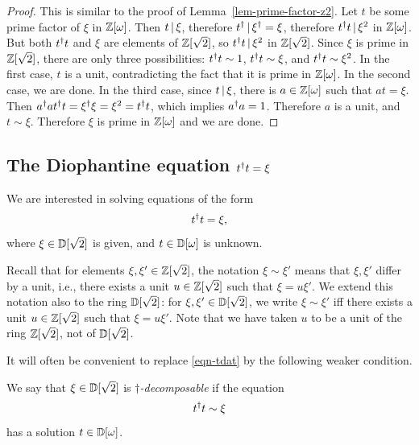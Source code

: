 \begin{proof}
  This is similar to the proof of Lemma~\ref{lem-prime-factor-z2}.
  Let $t$ be some prime factor of $\xi$ in $\mathbb{Z}[\omega]$. Then
  $t\mathop{|}\nolimits \xi$, therefore $t^{\dagger}\mathop{|}\nolimits \xi^{\dagger}=\xi$, therefore
  $t^{\dagger} t\mathop{|}\nolimits \xi^2$ in $\mathbb{Z}[\omega]$. But both $t^{\dagger} t$ and $\xi$
  are elements of $\mathbb{Z}[\sqrt2]$, so $t^{\dagger} t\mathop{|}\nolimits \xi^2$ in
  $\mathbb{Z}[\sqrt2]$. Since $\xi$ is prime in $\mathbb{Z}[\sqrt2]$, there are only
  three possibilities: $t^{\dagger} t\sim 1$, $t^{\dagger} t\sim \xi$, and $t^{\dagger}
  t\sim \xi^2$. In the first case, $t$ is a unit, contradicting the
  fact that it is prime in $\mathbb{Z}[\omega]$. In the second case, we are
  done. In the third case, since $t\mathop{|}\nolimits \xi$, there is
  $a\in\mathbb{Z}[\omega]$ such that $at=\xi$. Then $a^{\dagger} at^{\dagger}
  t=\xi^{\dagger}\xi=\xi^2 = t^{\dagger} t$, which implies $a^{\dagger} a=1$. Therefore $a$
  is a unit, and $t\sim \xi$. Therefore $\xi$ is prime in $\mathbb{Z}[\omega]$
  and we are done.
\end{proof}

\subsection[{The Diophantine equation t* t = xi}]
{The Diophantine equation $t^{\dagger} t=\xi$}

We are interested in solving equations of the form 
\begin{equation}\label{eqn-tdat}
t^{\dagger} t=\xi,
\end{equation}
where $\xi\in{\mathbb{D}}[\sqrt2]$ is given, and $t\in{\mathbb{D}}[\omega]$ is unknown.

\begin{definition}
  Recall that for elements $\xi,\xi'\in\mathbb{Z}[\sqrt2]$, the notation
  $\xi\sim\xi'$ means that $\xi,\xi'$ differ by a unit, i.e., there
  exists a unit $u\in\mathbb{Z}[\sqrt2]$ such that $\xi=u\xi'$. We extend this
  notation also to the ring ${\mathbb{D}}[\sqrt2]$: for $\xi,\xi'\in{\mathbb{D}}[\sqrt2]$,
  we write $\xi\sim\xi'$ iff there exists a unit $u\in\mathbb{Z}[\sqrt2]$ such
  that $\xi=u\xi'$. Note that we have taken $u$ to be a unit of the
  ring $\mathbb{Z}[\sqrt2]$, not of ${\mathbb{D}}[\sqrt2]$.
\end{definition}

It will often be convenient to replace {\eqref{eqn-tdat}} by the
following weaker condition. 

\begin{definition}
  We say that $\xi\in{\mathbb{D}}[\sqrt2]$ is \emph{$\dagger$-decomposable} if
  the equation
  \begin{equation}\label{eqn-tdat-associates}
    t^{\dagger} t\sim\xi
  \end{equation} 
  has a solution $t\in{\mathbb{D}}[\omega]$.
\end{definition}

